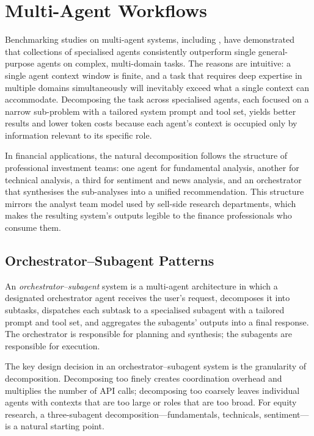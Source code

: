 \section{Multi-Agent Workflows}
\label{app:sdk-commercial:workflows}

Benchmarking studies on multi-agent systems, including \citet{liu2023agentbench}, have
demonstrated that collections of specialised agents consistently outperform single
general-purpose agents on complex, multi-domain tasks. The reasons are intuitive: a
single agent context window is finite, and a task that requires deep expertise in
multiple domains simultaneously will inevitably exceed what a single context can
accommodate. Decomposing the task across specialised agents, each focused on a narrow
sub-problem with a tailored system prompt and tool set, yields better results and
lower token costs because each agent's context is occupied only by information
relevant to its specific role.

In financial applications, the natural decomposition follows the structure of
professional investment teams: one agent for fundamental analysis, another for
technical analysis, a third for sentiment and news analysis, and an orchestrator that
synthesises the sub-analyses into a unified recommendation. This structure mirrors the
analyst team model used by sell-side research departments, which makes the resulting
system's outputs legible to the finance professionals who consume them.

\subsection{Orchestrator--Subagent Patterns}
\label{app:sdk-commercial:workflows:orchestrator}

\begin{definition}
\label{def:orchestrator-subagent}
An \emph{orchestrator--subagent} system is a multi-agent architecture in which a
designated orchestrator agent receives the user's request, decomposes it into
subtasks, dispatches each subtask to a specialised subagent with a tailored prompt
and tool set, and aggregates the subagents' outputs into a final response. The
orchestrator is responsible for planning and synthesis; the subagents are responsible
for execution.
\end{definition}

The key design decision in an orchestrator--subagent system is the granularity of
decomposition. Decomposing too finely creates coordination overhead and multiplies the
number of API calls; decomposing too coarsely leaves individual agents with contexts
that are too large or roles that are too broad. For equity research, a three-subagent
decomposition---fundamentals, technicals, sentiment---is a natural starting point.

